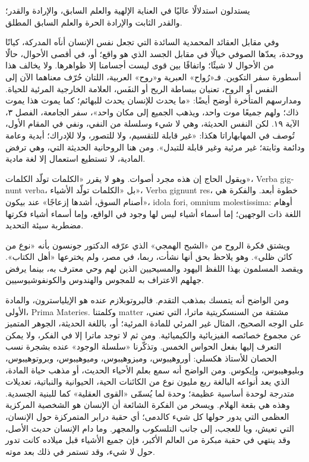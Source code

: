 \begin{SourceQuotation}
يستدلون استدلالًا عاليًا في العناية الإلهية والعلم السابق، والإرادة والقدر؛\\
والقدر الثابت والإرادة الحرة والعلم السابق المطلق.
\end{SourceQuotation}

وفي مقابل العقائد المحمدية السائدة التي تجعل نفس الإنسان أناَه المدركة، كيانًا ووحدة، يعدّها الصوفي خيالًا في مقابل الجسد الذي هو واقع؛ أو، في أقصى الأحوال، حالًا من الأحوال لا شيئًا؛ واتفاقًا بين قوى ليست أجسامنا إلا ظواهرها. ولا يخالف هذا أسطورة سفر التكوين. فـ«رُواح» العبرية و«روح» العربية، اللتان حُرّف معناهما الآن إلى النفس أو الروح، تعنيان ببساطة الريح أو النفَس، العلامة الخارجية المرئية للحياة. ومدارسهم المتأخرة أوضح أيضًا: «ما يحدث للإنسان يحدث للبهائم؛ كما يموت هذا يموت ذاك؛ ولهم جميعًا موت واحد، ويذهب الجميع إلى مكان واحد»، سفر الجامعة، الفصل ٣، الآية ١٩. لكن النفس الحديثة، وهي لا شيء وسلسلة من النفي، ونفي في المقام الأول، تُوصف في المهابهاراتا هكذا: «غير قابلة للتقسيم، ولا للتصور، ولا للإدراك؛ أبدية وعامة ودائمة وثابتة؛ غير مرئية وغير قابلة للتبدل». ومن هنا الروحانية الحديثة التي، وهي ترفض المادية، لا تستطيع استعمال إلا لغة مادية.

ويقول الحاج إن هذه مجرد أصوات. وهو لا يقرر «الكلمات تولّد الكلمات»، \textenglish{Verba gignunt verba}، بل «الكلمات تولّد الأشياء»، \textenglish{Verba gignunt res}، خطوة أبعد. والفكرة هي «أصنام السوق، أشدها إزعاجًا» عند بيكون، \textenglish{idola fori, omnium molestissima}: أوهام اللغة ذات الوجهين؛ إما أسماء أشياء ليس لها وجود في الواقع، وإما أسماء أشياء فكرتها مضطربة سيئة التحديد.

ويشتق فكرة الروح من «الشبح الهمجي» الذي عرّفه الدكتور جونسون بأنه «نوع من كائن ظلي». وهو يلاحظ بحق أنها نشأت، ربما، في مصر، ولم يخترعها «أهل الكتاب». ويقصد المسلمون بهذا اللفظ اليهود والمسيحيين الذين لهم وحي معترف به، بينما يرفض جهلهم الاعتراف به للمجوس والهندوس والكونفوشيوسيين.

ومن الواضح أنه يتمسك بمذهب التقدم. فالبروتوبلازم عنده هو الإيلياسترون، والمادة الأولى، \textenglish{Prima Materies}. وكلمتنا \textenglish{matter} مشتقة من السنسكريتية ماترا، التي تعني، على الوجه الصحيح، المثال غير المرئي للمادة المرئية؛ أو، باللغة الحديثة، الجوهر المتميز عن مجموع خصائصه الفيزيائية والكيميائية. ومن ثم لا توجد ماترا إلا في الفكر، ولا يمكن التعرف إليها بفعل الحواس الخمس. وتذكّرنا «سلسلة الوجود» عنده بشجرة نسب الحصان للأستاذ هكسلي: أوروهيبوس، وميزوهيبوس، وميوهيبوس، وبروتوهيبوس، وبليوهيبوس، وإيكوس. ومن الواضح أنه سمع بعلم الأحياء الحديث، أو مذهب حياة المادة، الذي يعد أنواعه البالغة ربع مليون نوع من الكائنات الحية، الحيوانية والنباتية، تعديلات متدرجة لوحدة أساسية عظيمة؛ وحدة لما يُسمّى «القوى العقلية» كما للبنية الجسدية. وهذه هي بقعة الهلام. ويسخر من الفكرة الشائعة أن الإنسان هو الشخصية المركزية العظمى التي يدور حولها كل شيء كالدمى؛ أي حقبة درابر المتمركزة حول الإنسان، التي تعيش، ويا للعجب، إلى جانب التلسكوب والمجهر. وما دام الإنسان حديث الأصل، وقد ينتهي في حقبة مبكرة من العالم الأكبر، فإن جميع الأشياء قبل ميلاده كانت تدور حول لا شيء، وقد تستمر في ذلك بعد موته.

